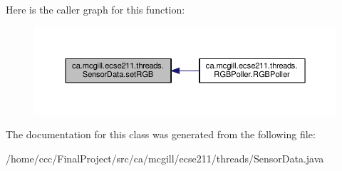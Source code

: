 Here is the caller graph for this function\+:
\nopagebreak
\begin{figure}[H]
\begin{center}
\leavevmode
\includegraphics[width=350pt]{classca_1_1mcgill_1_1ecse211_1_1threads_1_1_sensor_data_a6ad23111ecd378099f0b4ed0b6d398bc_icgraph}
\end{center}
\end{figure}


The documentation for this class was generated from the following file\+:\begin{DoxyCompactItemize}
\item 
/home/ccc/\+Final\+Project/src/ca/mcgill/ecse211/threads/Sensor\+Data.\+java\end{DoxyCompactItemize}
